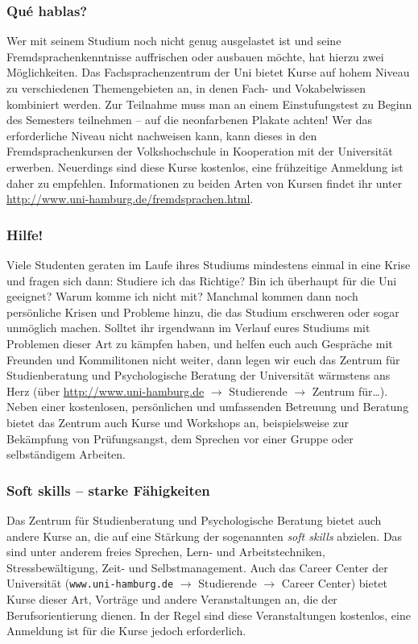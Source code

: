 \subsubsection{Qu\'{e} hablas?}

Wer mit seinem Studium noch nicht genug ausgelastet ist und seine
Fremdsprachenkenntnisse auffrischen oder ausbauen möchte, hat hierzu zwei
Möglichkeiten. Das Fachsprachenzentrum der Uni bietet Kurse auf hohem Niveau zu
verschiedenen Themengebieten an, in denen Fach- und Vokabelwissen kombiniert
werden. Zur Teilnahme muss man an einem Einstufungstest zu Beginn des Semesters
teilnehmen -- auf die neonfarbenen Plakate achten! Wer das erforderliche Niveau
nicht nachweisen kann, kann dieses in den Fremdsprachenkursen der
Volkshochschule in Kooperation mit der Universität erwerben. Neuerdings sind
diese Kurse kostenlos, eine frühzeitige Anmeldung ist daher zu empfehlen.
Informationen zu beiden Arten von Kursen findet ihr unter
\url{http://www.uni-hamburg.de/fremdsprachen.html}.

\subsubsection{Hilfe!}

Viele Studenten geraten im Laufe ihres Studiums mindestens einmal in eine Krise
und fragen sich dann: Studiere ich das Richtige? Bin ich überhaupt für die Uni
geeignet? Warum komme ich nicht mit? Manchmal kommen dann noch persönliche
Krisen und Probleme hinzu, die das Studium erschweren oder sogar unmöglich
machen. Solltet ihr irgendwann im Verlauf eures Studiums mit Problemen dieser
Art zu kämpfen haben, und helfen euch auch Gespräche mit Freunden und
Kommilitonen nicht weiter, dann legen wir euch das Zentrum für Studienberatung
und Psychologische Beratung der Universität wärmstens ans Herz (über
\url{http://www.uni-hamburg.de} $\rightarrow$ Studierende $\rightarrow$ Zentrum
für\ldots).  Neben einer kostenlosen, persönlichen und umfassenden Betreuung
und Beratung bietet das Zentrum auch Kurse und Workshops an, beispielsweise zur
Bekämpfung von Prüfungsangst, dem Sprechen vor einer Gruppe oder selbständigem
Arbeiten.

\subsubsection{Soft skills -- starke Fähigkeiten}

Das Zentrum für Studienberatung und Psychologische Beratung bietet auch andere
Kurse an, die auf eine Stärkung der sogenannten \emph{soft skills} abzielen.
Das sind unter anderem freies Sprechen, Lern- und Arbeitstechniken,
Stressbewältigung, Zeit- und Selbstmanagement. Auch das Career Center der
Universität ({\tt www.uni-hamburg.de} $\rightarrow$ Studierende $\rightarrow$
Career Center) bietet Kurse dieser Art, Vorträge und andere Veranstaltungen an,
die der Berufsorientierung dienen. In der Regel sind diese Veranstaltungen
kostenlos, eine Anmeldung ist für die Kurse jedoch erforderlich.

